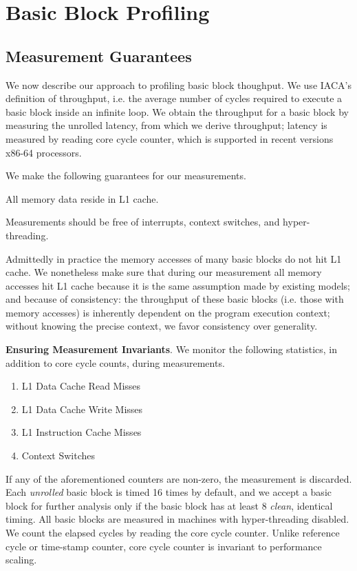 \section{Basic Block Profiling}
\subsection{Measurement Guarantees}
We now describe our approach to profiling basic block thoughput.
We use IACA's definition of throughput, i.e. 
the average number of cycles required to execute a basic block inside
an infinite loop.
We obtain the throughput for a basic block by measuring the unrolled latency,
from which we derive throughput; latency is measured by reading core cycle counter,
which is supported in recent versions x86-64 processors.

We make the following guarantees for our measurements.
\begin{enumerate*}
    \item All memory data reside in L1 cache.
    \item Measurements should be free of interrupts, context switches,
    and hyper-threading.
\end{enumerate*}
Admittedly in practice the memory accesses of many basic blocks do not hit L1 cache.
We nonetheless make sure that during our measurement all memory accesses hit L1 cache 
because it is the same assumption made by existing models;
and because of consistency: the throughput of these basic blocks (i.e. those with memory accesses)
is inherently dependent on the program execution context;
without knowing the precise context, we favor consistency over generality.

\textbf{Ensuring Measurement Invariants}.
We monitor the following statistics, in addition to core cycle counts,
during measurements.
\begin{enumerate}
    \item L1 Data Cache Read Misses
    \item L1 Data Cache Write Misses
    \item L1 Instruction Cache Misses
    \item Context Switches
\end{enumerate}
If any of the aforementioned counters are non-zero,
the measurement is discarded.
Each \textit{unrolled} basic block is timed 16 times by default,
and we accept a basic block for further analysis only if the basic block has at least 
8 \textit{clean}, identical timing.
All basic blocks are measured in machines with hyper-threading disabled.
We count the elapsed cycles by reading the core cycle counter.
Unlike reference cycle or time-stamp counter, core cycle counter is invariant
to performance scaling.

